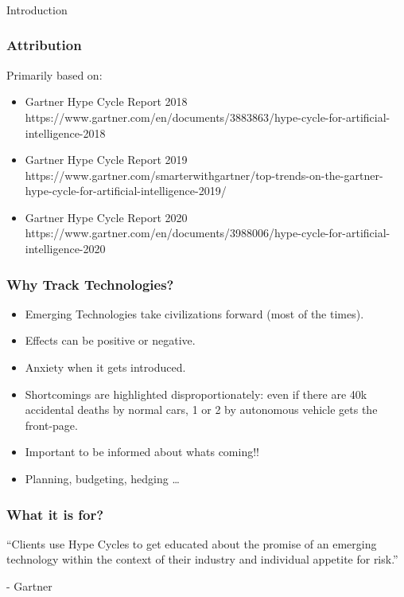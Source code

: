 \begin{frame}[fragile]\frametitle{}
\begin{center}
{\Large Introduction}
\end{center}
\end{frame}

\begin{frame}[fragile]\frametitle{Attribution}

Primarily based on:
\begin{itemize}
\item Gartner Hype Cycle Report 2018 {\tiny https://www.gartner.com/en/documents/3883863/hype-cycle-for-artificial-intelligence-2018}
\item Gartner Hype Cycle Report 2019 {\tiny https://www.gartner.com/smarterwithgartner/top-trends-on-the-gartner-hype-cycle-for-artificial-intelligence-2019/}
\item Gartner Hype Cycle Report 2020 {\tiny https://www.gartner.com/en/documents/3988006/hype-cycle-for-artificial-intelligence-2020}
\end{itemize}
\end{frame}


\begin{frame}[fragile]\frametitle{Why Track Technologies?}

\begin{itemize}
\item Emerging Technologies take civilizations forward (most of the times).
\item Effects can be positive or negative. 
\item Anxiety when it gets introduced.
\item Shortcomings are highlighted disproportionately: even if there are 40k accidental deaths by normal cars, 1 or 2 by autonomous vehicle gets the front-page.
\item Important to be informed about whats coming!!
\item Planning, budgeting, hedging \ldots
\end{itemize}
\end{frame}

\begin{frame}[fragile]\frametitle{What it is for?}

``Clients use Hype Cycles to get educated about the promise of an emerging technology within the context of their industry and individual appetite for risk.''

- Gartner 

\end{frame}

